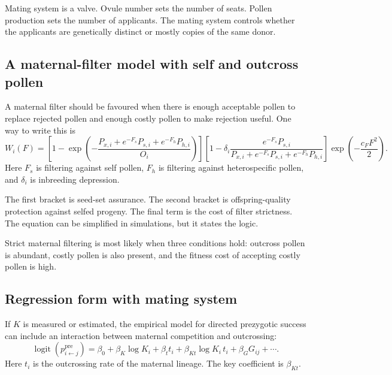 \documentclass[12pt]{article}
\newcommand{\logit}{\operatorname{logit}}
\begin{document}
\begin{metaphorbox}
Mating system is a valve. Ovule number sets the number of seats. Pollen production sets the number of applicants. The mating system controls whether the applicants are genetically distinct or mostly copies of the same donor.
\end{metaphorbox}

\subsection{A maternal-filter model with self and outcross pollen}

A maternal filter should be favoured when there is enough acceptable pollen to replace rejected pollen and enough costly pollen to make rejection useful. One way to write this is
\begin{equation}
W_i(F)=
\left[1-\exp\left(-\frac{P_{x,i}+e^{-F_s}P_{s,i}+e^{-F_h}P_{h,i}}{O_i}\right)\right]
\left[1-\delta_i
\frac{e^{-F_s}P_{s,i}}{P_{x,i}+e^{-F_s}P_{s,i}+e^{-F_h}P_{h,i}}\right]
\exp\left(-\frac{c_FF^2}{2}\right).
\label{eq:Wmating}
\end{equation}
Here $F_s$ is filtering against self pollen, $F_h$ is filtering against heterospecific pollen, and $\delta_i$ is inbreeding depression.

The first bracket is seed-set assurance. The second bracket is offspring-quality protection against selfed progeny. The final term is the cost of filter strictness. The equation can be simplified in simulations, but it states the logic.

\begin{conclusionbox}
Strict maternal filtering is most likely when three conditions hold: outcross pollen is abundant, costly pollen is also present, and the fitness cost of accepting costly pollen is high.
\end{conclusionbox}

\subsection{Regression form with mating system}

If $K$ is measured or estimated, the empirical model for directed prezygotic success can include an interaction between maternal competition and outcrossing:
\begin{equation}
\logit\left(p^{\mathrm{pre}}_{i\leftarrow j}\right)
=
\beta_0+\beta_K\log K_i+\beta_t t_i+\beta_{Kt}\log K_i\,t_i+\beta_GG_{ij}+\cdots.
\label{eq:matingRegression}
\end{equation}
Here $t_i$ is the outcrossing rate of the maternal lineage. The key coefficient is $\beta_{Kt}$.
\end{document}
